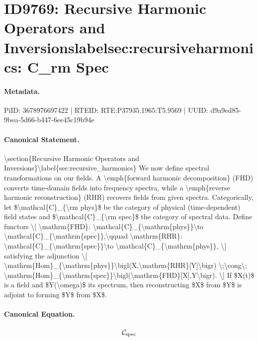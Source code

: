 \section*{ID9769: Recursive Harmonic Operators and Inversionslabelsec:recursiveharmonics: C\_rm Spec}
\paragraph{Metadata.}
PiID: 3678976697422 | RTEID: RTE:P37935.1965:T5.9569 | UUID: d9a9ed85-9bea-5d66-b447-6ee45c19b94e

\paragraph{Canonical Statement.}
\textbackslash{}section\{Recursive Harmonic Operators and Inversions\}\textbackslash{}label\{sec:recursive\_harmonics\} We now define spectral transformations on our fields. A \textbackslash{}emph\{forward harmonic decomposition\} (FHD) converts time-domain fields into frequency spectra, while a \textbackslash{}emph\{reverse harmonic reconstruction\} (RHR) recovers fields from given spectra. Categorically, let \$\textbackslash{}mathcal\{C\}\_\{\textbackslash{}rm phys\}\$ be the category of physical (time-dependent) field states and \$\textbackslash{}mathcal\{C\}\_\{\textbackslash{}rm spec\}\$ the category of spectral data. Define functors \textbackslash{}[ \textbackslash{}mathrm\{FHD\}: \textbackslash{}mathcal\{C\}\_\{\textbackslash{}mathrm\{phys\}\}\textbackslash{}to \textbackslash{}mathcal\{C\}\_\{\textbackslash{}mathrm\{spec\}\},\textbackslash{}qquad \textbackslash{}mathrm\{RHR\}: \textbackslash{}mathcal\{C\}\_\{\textbackslash{}mathrm\{spec\}\}\textbackslash{}to \textbackslash{}mathcal\{C\}\_\{\textbackslash{}mathrm\{phys\}\}, \textbackslash{}] satisfying the adjunction \textbackslash{}[ \textbackslash{}mathrm\{Hom\}\_\{\textbackslash{}mathrm\{phys\}\}\textbackslash{}bigl(X,\textbackslash{}mathrm\{RHR\}[Y]\textbackslash{}bigr) \textbackslash{};\textbackslash{}cong\textbackslash{}; \textbackslash{}mathrm\{Hom\}\_\{\textbackslash{}mathrm\{spec\}\}\textbackslash{}bigl(\textbackslash{}mathrm\{FHD\}[X],Y\textbackslash{}bigr). \textbackslash{}] If \$X(t)\$ is a field and \$Y(\textbackslash{}omega)\$ its spectrum, then reconstructing \$X\$ from \$Y\$ is adjoint to forming \$Y\$ from \$X\$.

\paragraph{Canonical Equation.}
\[
\mathcal{C}_{\rm spec}
\]

